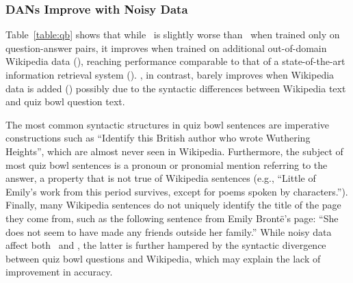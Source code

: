 \subsubsection{DANs Improve with Noisy Data}

Table~\ref{table:qb} shows that while \dan\ is slightly worse than \qanta\
when trained only on question-answer pairs, it improves when trained on
additional out-of-domain Wikipedia data (\danw), reaching performance comparable
to that of a state-of-the-art information retrieval system (\irw). \qanta, in
contrast, barely improves when Wikipedia data is added (\qantaw) possibly due to
the syntactic differences between Wikipedia text and quiz bowl question text.

The most common syntactic structures in quiz bowl sentences are imperative
constructions such as ``Identify this British author who wrote Wuthering
Heights'', which are almost never seen in Wikipedia. Furthermore, the subject of
most quiz bowl sentences is a pronoun or pronomial mention referring to the
answer, a property that is not true of Wikipedia sentences (e.g., ``Little of
Emily's work from this period survives, except for poems spoken by
characters.''). Finally, many Wikipedia sentences do not uniquely identify the
title of the page they come from, such as the following sentence from Emily
Bront{\"e}'s page: ``She does not seem to have made any friends outside her
family.'' While noisy data affect both \dan\ and \qanta, the latter is
further hampered by the syntactic divergence between quiz bowl questions and
Wikipedia, which may explain the lack of improvement in accuracy.


